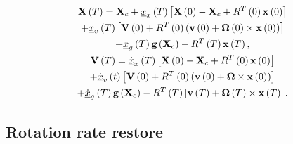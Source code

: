 \documentclass[twocolumn,showpacs,preprintnumbers]{revtex4}
\begin{document}
\begin{gather}
\mathbf{X}\left( T\right) =\mathbf{X}_{c}+\underline{x}_{x}\left( T\right) %
\left[ \mathbf{X}\left( 0\right) -\mathbf{X}_{c}+R^{T}\left( 0\right) 
\mathbf{x}\left( 0\right) \right]  \notag \\
+\underline{x}_{v}\left( T\right) \left[ \mathbf{V}\left( 0\right)
+R^{T}\left( 0\right) \left( \mathbf{v}\left( 0\right) +\mathbf{\Omega }%
\left( 0\right) \times \mathbf{x}\left( 0\right) \right) \right]  \notag \\
+\underline{x}_{g}\left( T\right) \mathbf{g}\left( \mathbf{X}_{c}\right)
-R^{T}\left( T\right) \mathbf{x}\left( T\right) ,  \label{40a} \\
\mathbf{V}\left( T\right) =\underline{\dot{x}}_{x}\left( T\right) \left[ 
\mathbf{X}\left( 0\right) -\mathbf{X}_{c}+R^{T}\left( 0\right) \mathbf{x}%
\left( 0\right) \right]  \notag \\
+\underline{\dot{x}}_{v}\left( t\right) \left[ \mathbf{V}\left( 0\right)
+R^{T}\left( 0\right) \left( \mathbf{v}\left( 0\right) +\mathbf{\Omega }%
\times \mathbf{x}\left( 0\right) \right) \right]  \notag \\
+\underline{\dot{x}}_{g}\left( T\right) \mathbf{g}\left( \mathbf{X}%
_{c}\right) -R^{T}\left( T\right) \left[ \mathbf{v}\left( T\right) +\mathbf{%
\Omega }\left( T\right) \times \mathbf{x}\left( T\right) \right] .
\label{40b}
\end{gather}

\subsection{\label{s3.1}Rotation rate restore}
\end{document}
